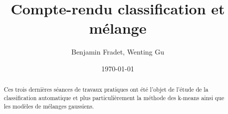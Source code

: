 \documentclass{article}
\title{Compte-rendu classification et mélange}
\author{Benjamin Fradet, Wenting Gu}
\date{\today}
\begin{document}
\maketitle
\thispagestyle{fancy}


\begin{abstract}

    Ces trois dernières séances de travaux pratiques ont été l'objet de l'étude
    de la classification automatique et plus particulièrement la méthode des
    k-means ainsi que les modèles de mélanges gaussiens.

\end{abstract}

\end{document}
